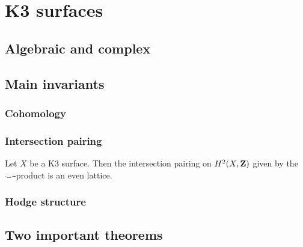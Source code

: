 \section{K3 surfaces}

\subsection{Algebraic and complex}

\subsection{Main invariants}

\subsubsection{Cohomology}
\subsubsection{Intersection pairing}

\begin{proposition}
    \label{intersection pairing on K3 is even}
    Let $X$ be a K3 surface. Then the intersection pairing on $H^2(X, \mathbf Z)$ given by the $\smallsmile$-product is an even lattice. 
\end{proposition}

\subsubsection{Hodge structure}

\subsection{Two important theorems}
